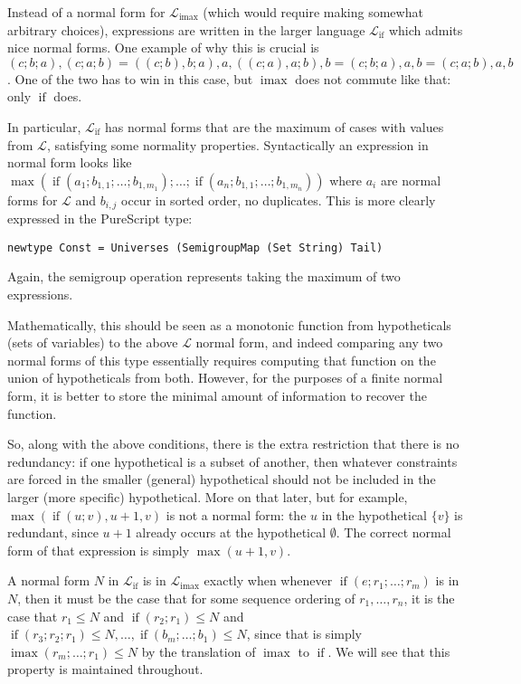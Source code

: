 \documentclass[11pt, twoside, reqno]{book}
\DeclareMathOperator{\imax}{imax}
\DeclareMathOperator{\ifop}{if}
\begin{document}
Instead of a normal form for $\mathcal{L}_{\imax}$ (which would require making somewhat arbitrary choices), expressions are written in the larger language $\mathcal{L}_{\ifop}$ which admits nice normal forms.
One example of why this is crucial is $(c; b; a), (c; a; b) = ((c; b), b; a), a, ((c; a), a; b), b = (c; b; a), a, b = (c; a; b), a, b$.
One of the two has to win in this case, but $\imax$ does not commute like that: only $\ifop$ does.


In particular, $\mathcal{L}_{\ifop}$ has normal forms that are the maximum of cases with values from $\mathcal{L}$, satisfying some normality properties.
Syntactically an expression in normal form looks like\\ $\max(\ifop(a_1; b_{1,1}; \dots; b_{1,m_1}); \dots; \ifop(a_n; b_{1,1}; \dots; b_{1,m_n}))$ where $a_i$ are normal forms for $\mathcal{L}$ and $b_{i,j}$ occur in sorted order, no duplicates.
This is more clearly expressed in the PureScript type:
\begin{verbatim}
newtype Const = Universes (SemigroupMap (Set String) Tail)
\end{verbatim}
Again, the semigroup operation represents taking the maximum of two expressions.

Mathematically, this should be seen as a monotonic function from hypotheticals (sets of variables) to the above $\mathcal{L}$ normal form, and indeed comparing any two normal forms of this type essentially requires computing that function on the union of hypotheticals from both.
However, for the purposes of a finite normal form, it is better to store the minimal amount of information to recover the function.

So, along with the above conditions, there is the extra restriction that there is no redundancy: if one hypothetical is a subset of another, then whatever constraints are forced in the smaller (general) hypothetical should not be included in the larger (more specific) hypothetical.
More on that later, but for example, $\max(\ifop(u; v), u + 1, v)$ is not a normal form: the $u$ in the hypothetical $\{v\}$ is redundant, since $u + 1$ already occurs at the hypothetical $\emptyset$.
The correct normal form of that expression is simply $\max(u+1, v)$.

A normal form $N$ in $\mathcal{L}_{\ifop}$ is in $\mathcal{L}_{\imax}$ exactly when whenever $\ifop(e; r_1; \dots; r_m)$ is in $N$, then it must be the case that for some sequence ordering of $r_1, \dots, r_n$, it is the case that $r_1 \le N$ and $\ifop(r_2; r_1) \le N$ and $\ifop(r_3; r_2; r_1) \le N, \dots, \ifop(b_m; \dots; b_1) \le N$, since that is simply $\imax(r_m; \dots; r_1) \le N$ by the translation of $\imax$ to $\ifop$.
We will see that this property is maintained throughout.
\end{document}
